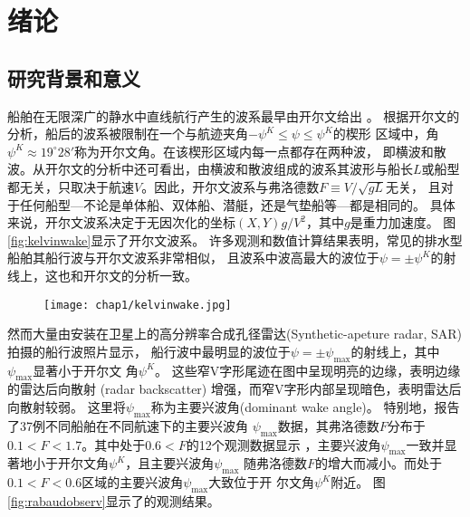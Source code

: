 
\chapter{绪论}
\label{chap:intro}



\section{研究背景和意义}
\label{sec:background}

船舶在无限深广的静水中直线航行产生的波系最早由开尔文给出
\supercite{Thomson1887ship}。
根据开尔文的分析，船后的波系被限制在一个与航迹夹角$-\psi^K\le\psi\le\psi^K$的楔形
区域中，角$\psi^K\approx19^\circ28'$称为开尔文角。在该楔形区域内每一点都存在两种波，
即横波和散波。从开尔文的分析中还可看出，由横波和散波组成的波系其波形与船长$L$或船型
都无关，只取决于航速$V$。因此，开尔文波系与弗洛德数$F\equiv V/\sqrt{gL}$无关，
且对于任何船型---不论是单体船、双体船、潜艇，还是气垫船等---都是相同的。
具体来说，开尔文波系决定于无因次化的坐标$(X,Y)g/V^2$，其中$g$是重力加速度。
图\ref{fig:kelvinwake}显示了开尔文波系。
许多观测和数值计算结果表明，常见的排水型船舶其船行波与开尔文波系非常相似，
且波系中波高最大的波位于$\psi=\pm\psi^K$的射线上，这也和开尔文的分析一致。

\begin{figure}[htp]
  \centering
  \captionstyle{\centering}
  \texttt{[image: chap1/kelvinwake.jpg]}
\end{figure}

然而大量由安装在卫星上的高分辨率合成孔径雷达(Synthetic-apeture radar, SAR)
拍摄的船行波照片显示，
船行波中最明显的波位于$\psi=\pm\psi_{\max}$的射线上，其中$\psi_{\max}$显著小于开尔文
角$\psi^K$\supercite{Taylor1910Resistance,Baker1915Ship,Munk1987Ships,Brown1989Observations,Reed2002Ship,Fang2011Kelvin,Rabaud2013Ship}。
这些窄V字形尾迹在图中呈现明亮的边缘，表明边缘的雷达后向散射 (radar backscatter) 
增强，而窄V字形内部呈现暗色，表明雷达后向散射较弱\supercite{Reed2002Ship}。
这里将$\psi_{\max}$称为主要兴波角(dominant wake angle)。
特别地，\parencite{Rabaud2013Ship}报告了37例不同船舶在不同航速下的主要兴波角
$\psi_{\max}$数据，其弗洛德数$F$分布于$0.1<F<1.7$。其中处于$0.6<F$的12个观测数据显示
，主要兴波角$\psi_{\max}$一致并显著地小于开尔文角$\psi^K$，且主要兴波角$\psi_{\max}$
随弗洛德数$F$的增大而减小。而处于$0.1<F<0.6$区域的主要兴波角$\psi_{\max}$大致位于开
尔文角$\psi^K$附近。
图\ref{fig:rabaudobserv}显示了\parencite{Rabaud2013Ship}的观测结果。

